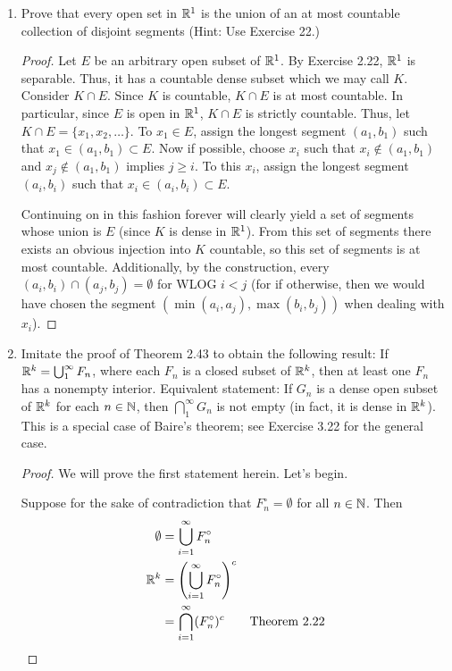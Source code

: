 \documentclass[../psets.tex]{subfiles}
\begin{document}
\begin{enumerate}[label={\textbf{\arabic*.}}]
\begin{proof}
    \end{proof}
    \item Prove that every open set in $\mathbb{R}^1$ is the union of an at most countable collection of disjoint segments (Hint: Use Exercise 22.)
    \begin{proof}
        Let $E$ be an arbitrary open subset of $\mathbb{R}^1$. By Exercise 2.22, $\mathbb{R}^1$ is separable. Thus, it has a countable dense subset which we may call $K$. Consider $K\cap E$. Since $K$ is countable, $K\cap E$ is at most countable. In particular, since $E$ is open in $\mathbb{R}^1$, $K\cap E$ is strictly countable. Thus, let $K\cap E=\{x_1,x_2,\dots\}$. To $x_1\in E$, assign the longest segment $(a_1,b_1)$ such that $x_1\in(a_1,b_1)\subset E$. Now if possible, choose $x_i$ such that $x_i\notin(a_1,b_1)$ and $x_j\notin(a_1,b_1)$ implies $j\geq i$. To this $x_i$, assign the longest segment $(a_i,b_i)$ such that $x_i\in(a_i,b_i)\subset E$.\par
        Continuing on in this fashion forever will clearly yield a set of segments whose union is $E$ (since $K$ is dense in $\mathbb{R}^1$). From this set of segments there exists an obvious injection into $K$ countable, so this set of segments is at most countable. Additionally, by the construction, every $(a_i,b_i)\cap(a_j,b_j)=\emptyset$ for WLOG $i<j$ (for if otherwise, then we would have chosen the segment $(\min(a_i,a_j),\max(b_i,b_j))$ when dealing with $x_i$).
    \end{proof}
    \item Imitate the proof of Theorem 2.43 to obtain the following result: If $\mathbb{R}^k=\bigcup_1^\infty F_n$, where each $F_n$ is a closed subset of $\mathbb{R}^k$, then at least one $F_n$ has a nonempty interior. Equivalent statement: If $G_n$ is a dense open subset of $\mathbb{R}^k$ for each $n\in\mathbb{N}$, then $\bigcap_1^\infty G_n$ is not empty (in fact, it is dense in $\mathbb{R}^k$). This is a special case of Baire's theorem; see Exercise 3.22 for the general case.
    \begin{proof}
        We will prove the first statement herein. Let's begin.\par
        Suppose for the sake of contradiction that $F_n^\circ=\emptyset$ for all $n\in\mathbb{N}$. Then
        \begin{align*}
            \emptyset &= \bigcup_{i=1}^\infty F_n^\circ\\
            \R^k &= \left( \bigcup_{i=1}^\infty F_n^\circ \right)^c\\
            &= \bigcap_{i=1}^\infty(F_n^\circ)^c\tag*{Theorem 2.22}\\

\end{align*}
\end{proof}
\end{enumerate}
\end{document}
